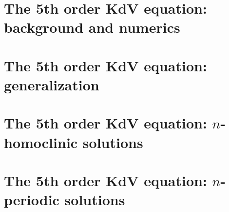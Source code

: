 \documentclass[11pt,reqno,oneside]{amsbook}
\theoremstyle{plain}
\theoremstyle{definition}
\theoremstyle{remark}
\numberwithin{section}{chapter}
\numberwithin{equation}{chapter}
\newif\iffulldocument
\begin{document}
\fulldocumenttrue

\mainmatter

\chapter{The 5th order KdV equation: background and numerics}\label{chapter:KdV5}



\chapter{The 5th order KdV equation: generalization}\label{chapter:kdv5general}



\chapter{The 5th order KdV equation: $n$-homoclinic solutions}\label{chapter:kdv5homoclinic}


\chapter{The 5th order KdV equation: $n$-periodic solutions }\label{chapter:kdv5periodic}

% 
% 
% 

% 

\backmatter



\end{document}
